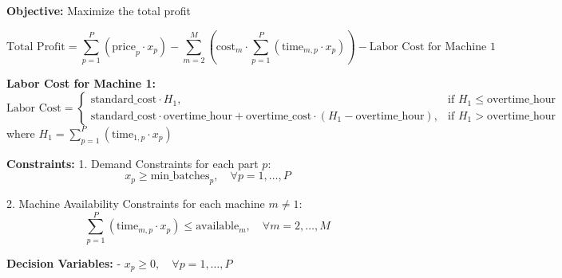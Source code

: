 \documentclass{article}
\begin{document}
\textbf{Objective:} Maximize the total profit

\[
\text{Total Profit} = \sum_{p=1}^{P} \left( \text{price}_p \cdot x_p \right) - \sum_{m=2}^{M} \left( \text{cost}_m \cdot \sum_{p=1}^{P} \left( \text{time}_{m,p} \cdot x_p \right) \right) - \text{Labor Cost for Machine 1}
\]

\textbf{Labor Cost for Machine 1:}
\[
\text{Labor Cost} = 
\begin{cases} 
\text{standard\_cost} \cdot H_1, & \text{if } H_1 \leq \text{overtime\_hour} \\
\text{standard\_cost} \cdot \text{overtime\_hour} + \text{overtime\_cost} \cdot (H_1 - \text{overtime\_hour}), & \text{if } H_1 > \text{overtime\_hour}
\end{cases}
\]
where \( H_1 = \sum_{p=1}^{P} \left( \text{time}_{1,p} \cdot x_p \right)\)

\textbf{Constraints:}
1. Demand Constraints for each part \( p \):
\[
x_p \geq \text{min\_batches}_p, \quad \forall p = 1, \ldots, P
\]

2. Machine Availability Constraints for each machine \( m \neq 1 \):
\[
\sum_{p=1}^{P} \left( \text{time}_{m,p} \cdot x_p \right) \leq \text{available}_m, \quad \forall m = 2, \ldots, M
\]

\textbf{Decision Variables:}
- \( x_p \geq 0, \quad \forall p = 1, \ldots, P \)
\end{document}
